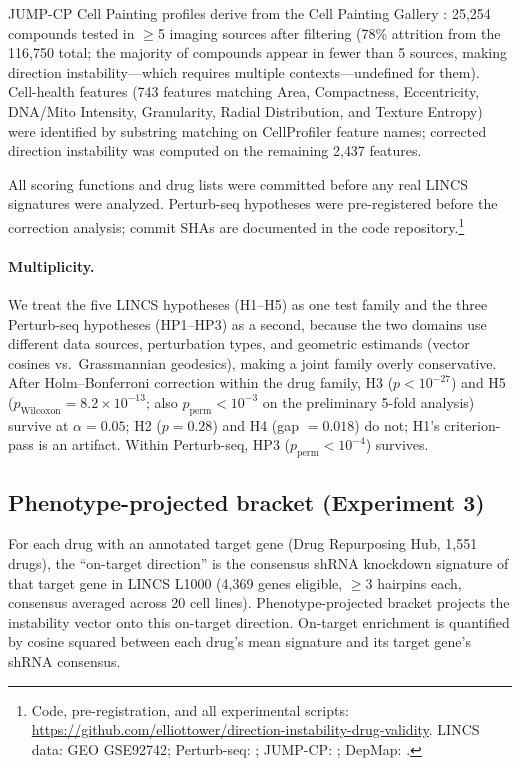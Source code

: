 \documentclass{article}
\begin{document}
JUMP-CP Cell Painting profiles derive from the Cell Painting Gallery
\citep{chandrasekaran2023jump}: 25{,}254 compounds tested in $\geq$5
imaging sources after filtering (78\% attrition from the 116{,}750
total; the majority of compounds appear in fewer than 5 sources,
making direction instability---which requires multiple
contexts---undefined for them). Cell-health features (743 features matching Area,
Compactness, Eccentricity, DNA/Mito Intensity, Granularity, Radial
Distribution, and Texture Entropy) were identified by substring matching
on CellProfiler feature names; corrected direction instability was computed
on the remaining 2{,}437 features.

All scoring functions and drug lists were committed before any real LINCS
signatures were analyzed. Perturb-seq hypotheses were pre-registered before
the correction analysis; commit SHAs are documented in the code
repository.\footnote{Code, pre-registration, and all experimental
scripts: \url{https://github.com/elliottower/direction-instability-drug-validity}.
LINCS data: GEO GSE92742; Perturb-seq: \citet{replogle2022mapping};
JUMP-CP: \citet{chandrasekaran2023jump}; DepMap: \citet{dempster2021chronos}.}

\paragraph{Multiplicity.}
We treat the five LINCS hypotheses (H1--H5) as one test family and the
three Perturb-seq hypotheses (HP1--HP3) as a second, because the two
domains use different data sources, perturbation types, and geometric
estimands (vector cosines vs.\ Grassmannian geodesics), making a joint
family overly conservative. After Holm--Bonferroni
correction within the drug family, H3 ($p < 10^{-27}$) and H5
($p_{\text{Wilcoxon}} = 8.2 \times 10^{-13}$; also
$p_{\text{perm}} < 10^{-3}$ on the preliminary 5-fold analysis) survive
at $\alpha = 0.05$; H2 ($p = 0.28$) and H4 (gap $= 0.018$) do not;
H1's criterion-pass is an artifact.
Within Perturb-seq, HP3 ($p_{\text{perm}} < 10^{-4}$) survives.

\subsection{Phenotype-projected bracket (Experiment 3)}

For each drug with an annotated target gene (Drug Repurposing Hub,
1{,}551 drugs), the ``on-target direction'' is the consensus shRNA
knockdown signature of that target gene in LINCS L1000 (4{,}369 genes
eligible, $\geq$3 hairpins each, consensus averaged across 20 cell lines).
Phenotype-projected bracket projects the instability vector onto this
on-target direction. On-target enrichment is quantified by cosine squared
between each drug's mean signature and its target gene's shRNA consensus.
\end{document}
